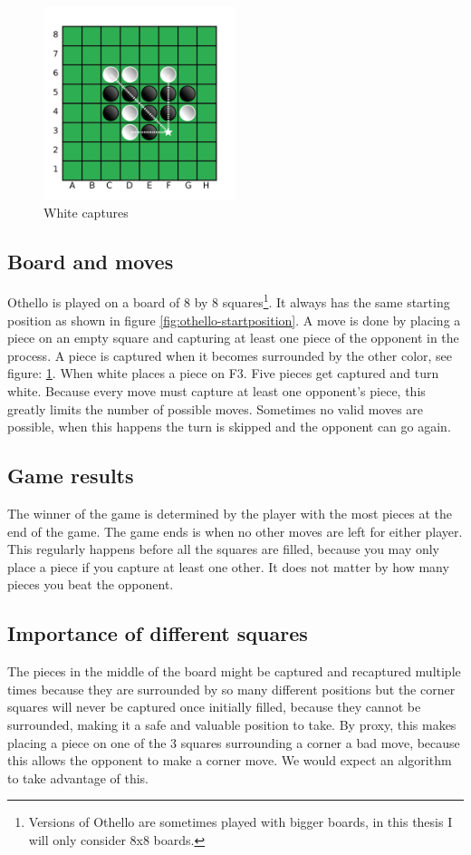 \documentclass[
11pt, %
english, %
singlespacing, %
headsepline, %
]{MastersDoctoralThesis} %
\begin{document}
\begin{figure}
	\centering
	\includegraphics[width=0.5\textwidth]{images/capture}
	\caption{White captures}
	\label{fig:othello-capture}
\end{figure}
\subsection{Board and moves}
Othello is played on a board of 8 by 8 squares\footnote{Versions of Othello are sometimes played with bigger boards, in this thesis I will only consider 8x8 boards.}. It always has the same starting position as shown in figure \ref{fig:othello-startposition}. A move is done by placing a piece on an empty square and capturing at least one piece of the opponent in the process. A piece is captured when it becomes surrounded by the other color, see figure: \ref{fig:othello-capture}. When white places a piece on F3. Five pieces get captured and turn white. Because every move must capture at least one opponent's piece, this greatly limits the number of possible moves. Sometimes no valid moves are possible, when this happens the turn is skipped and the opponent can go again.
\subsection{Game results} The winner of the game is determined by the player with the most pieces at the end of the game. The game ends is when no other moves are left for either player. This regularly happens before all the squares are filled, because you may only place a piece if you capture at least one other. It does not matter by how many pieces you beat the opponent.
\subsection{Importance of different squares} The pieces in the middle of the board might be captured and recaptured multiple times because they are surrounded by so many different positions but the corner squares will never be captured once initially filled, because they cannot be surrounded, making it a safe and valuable position to take. By proxy, this makes placing a piece on one of the 3 squares surrounding a corner a bad move, because this allows the opponent to make a corner move. We would expect an algorithm to take advantage of this. 
\end{document}
